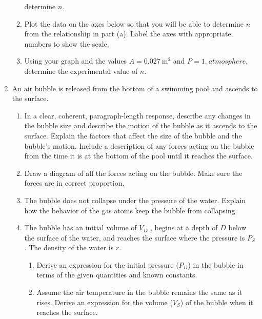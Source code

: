 \documentclass{../../../oss-apphys}
\begin{document}
\begin{enumerate}[leftmargin=15pt]
\begin{enumerate}[leftmargin=18pt]
    determine $n$.
  \item Plot the data on the axes below so that you will be able to determine
    $n$ from the relationship in part (a). Label the axes with appropriate
    numbers to show the scale.
    \begin{center}
    \end{center}
  \item Using your graph and the values $A=\SI{0.027}{\metre^2}$ and
    $P=\SI{1.}{atmosphere}$, determine the experimental value of $n$.
    \vspace{1in}
  \end{enumerate}
\item An air bubble is released from the bottom of a swimming pool and ascends
  to the surface.
  \begin{enumerate}[leftmargin=18pt]
  \item In a clear, coherent, paragraph-length response, describe any changes
    in the bubble size and describe the motion of the bubble
    as it ascends to the surface. Explain the factors that affect the size
    of the bubble and the bubble's motion. Include a description of
    any forces acting on the bubble from the time it is at the bottom of
    the pool until it reaches the surface.
    \vspace{1.75in}
    
  \item Draw a diagram of all the forces acting on the bubble. Make sure
    the forces are in correct proportion.
    \vspace{1.75in}

  \item The bubble does not collapse under the pressure of the water.
    Explain how the behavior of the gas atoms keep the bubble from
    collapsing.
    \newpage
    
  \item The bubble has an initial volume of $V_D$ , begins at a depth of $D$
    below the surface of the water, and reaches the surface where the
    pressure is $P_S$ . The density of the water is $r$.
    \begin{enumerate}
    \item  Derive an expression for the initial pressure ($P_D$) in the bubble
      in terms of the given quantities and known constants.
    \item Assume the air temperature in the bubble remains the same as
      it rises. Derive an expression for the volume ($V_S$) of the bubble
      when it reaches the surface.
    \end{enumerate}
    \vspace{2in}
    

\end{enumerate}
\end{enumerate}
\end{document}
